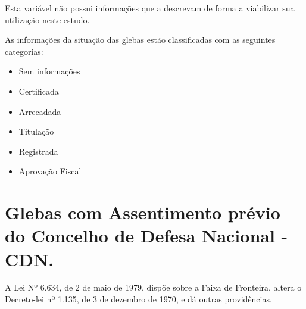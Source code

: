 \documentclass[
  letterpaper,
]{report}
\providecommand{\tightlist}{%
  \setlength{\itemsep}{0pt}\setlength{\parskip}{0pt}}\usepackage{longtable,booktabs,array}
\begin{document}
Esta variável não possui informações que a descrevam de forma a
viabilizar sua utilização neste estudo.

As informações da situação das glebas estão classificadas com as
seguintes categorias:

\begin{itemize}
\tightlist
\item
  Sem informações
\item
  Certificada
\item
  Arrecadada
\item
  Titulação
\item
  Registrada
\item
  Aprovação Fiscal
\end{itemize}


\hypertarget{glebas-com-assentimento-pruxe9vio-do-concelho-de-defesa-nacional---cdn.-1}{%
\chapter{Glebas com Assentimento prévio do Concelho de Defesa Nacional -
CDN.}\label{glebas-com-assentimento-pruxe9vio-do-concelho-de-defesa-nacional---cdn.-1}}

A Lei Nº 6.634, de 2 de maio de 1979, dispõe sobre a Faixa de Fronteira,
altera o Decreto-lei nº 1.135, de 3 de dezembro de 1970, e dá outras
providências.
\end{document}
